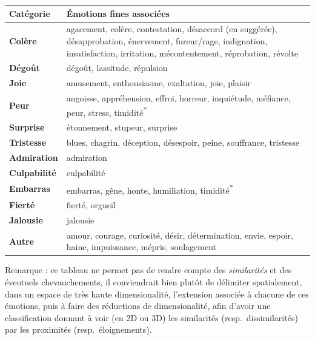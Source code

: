 \documentclass[french, 11pt]{article}
\begin{document}
\begin{tabular}{@{} >{\bfseries}l p{10cm} @{}}
\toprule
Catégorie & Émotions fines associées \\
\midrule
Colère & agacement, colère, contestation, désaccord (en suggérée),
         désapprobation, énervement, fureur/rage, indignation,
         insatisfaction, irritation, mécontentement, réprobation,
         révolte \\
Dégoût & dégoût, lassitude, répulsion \\
Joie   & amusement, enthousiasme, exaltation, joie, plaisir \\
Peur   & angoisse, appréhension, effroi, horreur, inquiétude,
         méfiance, peur, stress, timidité\textsuperscript{*} \\
Surprise  & étonnement, stupeur, surprise \\
Tristesse & blues, chagrin, déception, désespoir, peine, souffrance,
            tristesse \\
\addlinespace
Admiration  & admiration \\
Culpabilité & culpabilité \\
Embarras    & embarras, gêne, honte, humiliation,
              timidité\textsuperscript{*} \\
Fierté      & fierté, orgueil \\
Jalousie    & jalousie \\
\addlinespace
Autre & amour, courage, curiosité, désir, détermination, envie,
        espoir, haine, impuissance, mépris, soulagement \\
\bottomrule
\end{tabular}

\smallskip
{}


\vspace{10mm}
Remarque : ce tableau ne permet pas de rendre compte des \textit{similarités} et
des éventuels chevauchements, il conviendrait bien plutôt de délimiter
spatialement, dans un espace de très haute dimensionalité, l'extension
associée à chacune de ces émotions, puis à faire des réductions de
dimensionalité, afin d'avoir une classification donnant à voir (en 2D ou
3D) les similarités (resp.\ dissimilarités) par les proximités
(resp.\ éloignements).
\printbibliography
\end{document}
